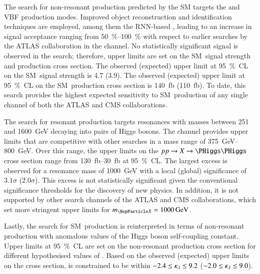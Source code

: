 The search for non-resonant \HH production predicted by the SM targets the \ggF
and VBF production modes. Improved object reconstruction and identification
techniques are employed, among them the RNN-based \tauid, leading to an increase
in signal acceptance ranging from \SIrange{50}{100}{\percent} with respect to
earlier searches by the ATLAS collaboration in the \bbtautau channel. No
statistically significant signal is observed in the search; therefore, upper
limits are set on the SM~\HH signal strength and production cross section. The
observed (expected) upper limit at \SI{95}{\percent}~CL on the SM~\HH signal
strength is 4.7 (3.9).  The observed (expected) upper limit at
\SI{95}{\percent}~CL on the SM~\HH production cross section is
\SI{140}{\femto\barn} (\SI{110}{\femto\barn}). To date, this search provides the
highest expected sensitivity to SM~\HH production of any single channel of both
the ATLAS and CMS collaborations.


The search for resonant \HH production targets resonances with masses between
\num{251} and \SI{1600}{\GeV} decaying into pairs of Higgs bosons. The \bbtautau
channel provides upper limits that are competitive with other searches in a mass
range of \SIrange{375}{800}{\GeV}. Over this range, the upper limits on the
$pp \to X \to \HH$ cross section range from \SIrange{130}{30}{\femto\barn} at
\SI{95}{\percent}~CL. The largest excess is observed for a resonance mass of
\SI{1000}{\GeV} with a local (global) significance of $3.1\sigma$
($2.0\sigma$). This excess is not statistically significant given the
conventional significance thresholds for the discovery of new physics. In
addition, it is not supported by other search channels of the ATLAS and CMS
collaborations, which set more stringent upper limits for
$\mX = \SI{1000}{\GeV}$.


Lastly, the search for SM~\HH production is reinterpreted in terms of
non-resonant \HH production with anomalous values of the Higgs boson
self-coupling constant. Upper limits at \SI{95}{\percent}~CL are set on the
non-resonant \HH production cross section for different hypothesised values of
\klambda. Based on the observed (expected) upper limits on the cross section,
\klambda is constrained to be within $-2.4 \leq \kappa_{\lambda} \leq 9.2$
($-2.0 \leq \kappa_{\lambda} \leq 9.0$).


